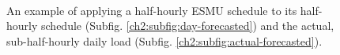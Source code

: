 \begin{figure}\centering
	\\
	\caption{An example of applying a half-hourly ESMU schedule to its half-hourly schedule (Subfig. \ref{ch2:subfig:day-forecasted}) and the actual, sub-half-hourly daily load (Subfig. \ref{ch2:subfig:actual-forecasted}).}
	\label{ch2:fig:cost-sample}
\end{figure}